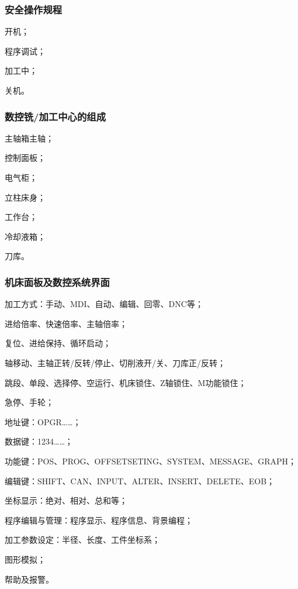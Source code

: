 \subsubsection{安全操作规程}
\begin{compactenum}[1、]
\item 开机；
\item 程序调试；
\item 加工中；
\item 关机。
\end{compactenum}

\subsubsection{数控铣/加工中心的组成}
\begin{compactenum}[1、]
\item 主轴箱主轴；
\item 控制面板；
\item 电气柜；
\item 立柱床身；
\item 工作台；
\item 冷却液箱；
\item 刀库。
\end{compactenum}

\subsubsection{机床面板及数控系统界面}
\begin{compactenum}[1、]
\item 加工方式：手动、MDI、自动、编辑、回零、DNC等；
\item 进给倍率、快速倍率、主轴倍率；
\item 复位、进给保持、循环启动；
\item 轴移动、主轴正转/反转/停止、切削液开/关、刀库正/反转；
\item 跳段、单段、选择停、空运行、机床锁住、Z轴锁住、M功能锁住；
\item 急停、手轮；
\item 地址键：OPGR……；
\item 数据键：1234……；
\item 功能键：POS、PROG、OFFSETSETING、SYSTEM、MESSAGE、GRAPH；
\item 编辑键：SHIFT、CAN、INPUT、ALTER、INSERT、DELETE、EOB；
\item 坐标显示：绝对、相对、总和等；
\item 程序编辑与管理：程序显示、程序信息、背景编程；
\item 加工参数设定：半径、长度、工件坐标系；
\item 图形模拟；
\item 帮助及报警。
\end{compactenum}

